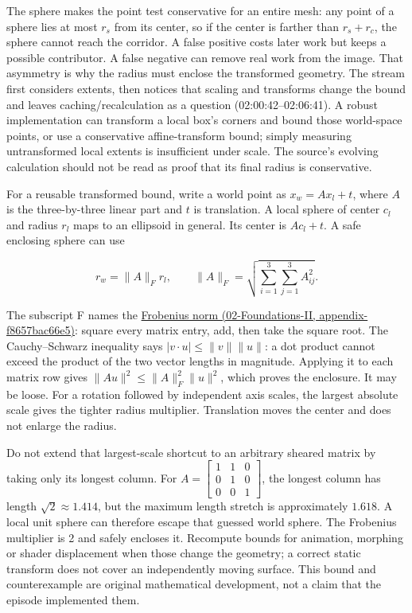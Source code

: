 The sphere makes the point test conservative for an entire mesh: any point of a sphere lies at most \(r_s\) from its center, so if the center is farther than \(r_s+r_c\), the sphere cannot reach the corridor. A false positive costs later work but keeps a possible contributor. A false negative can remove real work from the image. That asymmetry is why the radius must enclose the transformed geometry. The stream first considers extents, then notices that scaling and transforms change the bound and leaves caching/recalculation as a question (02:00:42--02:06:41). A robust implementation can transform a local box's corners and bound those world-space points, or use a conservative affine-transform bound; simply measuring untransformed local extents is insufficient under scale. The source's evolving calculation should not be read as proof that its final radius is conservative.

For a reusable transformed bound, write a world point as \(x_w=A x_l+t\), where \(A\) is the three-by-three linear part and \(t\) is translation. A local sphere of center \(c_l\) and radius \(r_l\) maps to an ellipsoid in general. Its center is \(A c_l+t\). A safe enclosing sphere can use

\[
r_w=\|A\|_F r_l,\qquad
\|A\|_F=\sqrt{\sum_{i=1}^3\sum_{j=1}^3 A_{ij}^2}.
\]

The subscript F names the \href{}{Frobenius norm (02-Foundations-II, appendix-f8657bac66e5)}: square every matrix entry, add, then take the square root. The Cauchy--Schwarz inequality says \(|v\cdot u|\leq\|v\|\|u\|\): a dot product cannot exceed the product of the two vector lengths in magnitude. Applying it to each matrix row gives \(\|Au\|^2\leq\|A\|_F^2\|u\|^2\), which proves the enclosure. It may be loose. For a rotation followed by independent axis scales, the largest absolute scale gives the tighter radius multiplier. Translation moves the center and does not enlarge the radius.

Do not extend that largest-scale shortcut to an arbitrary sheared matrix by taking only its longest column. For \(A=\begin{bmatrix}1&1&0\\0&1&0\\0&0&1\end{bmatrix}\), the longest column has length \(\sqrt2\approx1.414\), but the maximum length stretch is approximately \(1.618\). A local unit sphere can therefore escape that guessed world sphere. The Frobenius multiplier is 2 and safely encloses it. Recompute bounds for animation, morphing or shader displacement when those change the geometry; a correct static transform does not cover an independently moving surface. This bound and counterexample are original mathematical development, not a claim that the episode implemented them.

